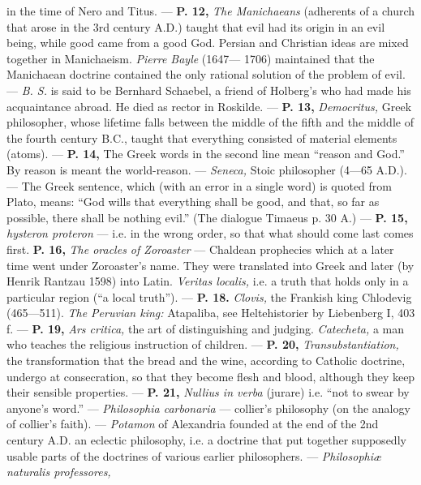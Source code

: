\documentclass[12pt,a4paper,openany]{book}
\newcommand{\opage}[1]{\marginnote{\footnotesize\textit{[#1]}}}
\begin{document}
in the time of Nero and Titus. --- \textbf{P. 12,} \textit{The Manichaeans} (adherents of a church
that arose in the 3rd century A.D.) taught that evil had its origin in
an evil being, while good came from a good God. Persian and
Christian ideas are mixed together in Manichaeism. \textit{Pierre Bayle} (1647---
1706) maintained that the Manichaean doctrine contained the only rational
solution of the problem of evil. --- \textit{B. S.} is said to be Bernhard Schaebel,
a friend of Holberg's who had made his acquaintance abroad. He
died as rector in Roskilde. --- \textbf{P. 13,} \textit{Democritus,} Greek philosopher, whose
lifetime falls between the middle of the fifth and the middle of the fourth century
B.C., taught that everything consisted of material elements (atoms). --- \textbf{P. 14,}
The Greek words in the second line mean ``reason and God.'' By reason
is meant the world-reason. --- \textit{Seneca,} Stoic philosopher (4—65 A.D.). ---
\setcounter{footnote}{0}%
\opage{302}The Greek sentence, which (with an error in a single word) is quoted from Plato,
means: ``God wills that everything shall be good, and that, so far as possible, there shall be nothing
evil.'' (The dialogue Timaeus p. 30 A.) --- \textbf{P. 15,} \textit{hysteron proteron} ---
i.e. in the wrong order, so that what should come last comes first.
\textbf{P. 16,} \textit{The oracles of Zoroaster} --- Chaldean prophecies which at a later time
went under Zoroaster's name. They were translated into Greek and later (by Henrik
Rantzau 1598) into Latin. \textit{Veritas localis,} i.e. a truth that holds only
in a particular region (``a local truth''). --- \textbf{P. 18.} \textit{Clovis,} the
Frankish king Chlodevig (465—511). \textit{The Peruvian king:} Atapaliba,
see Heltehistorier by Liebenberg I, 403 f. --- \textbf{P. 19,} \textit{Ars critica,} the art
of distinguishing and judging. \textit{Catecheta,} a man who teaches the religious
instruction of children. --- \textbf{P. 20,} \textit{Transubstantiation,} the transformation that the bread and
the wine, according to Catholic doctrine, undergo at consecration, so that they become
flesh and blood, although they keep their sensible properties. --- \textbf{P. 21,}
\textit{Nullius in verba} (jurare) i.e. ``not to swear by anyone's word.'' --- \textit{Philosophia
carbonaria} --- collier's philosophy (on the analogy of collier's faith). --- \textit{Potamon}
of Alexandria founded at the end of the 2nd century A.D. an eclectic
philosophy, i.e. a doctrine that put together supposedly usable parts of
the doctrines of various earlier philosophers. --- \textit{Philosophiæ naturalis professores,}
\end{document}
